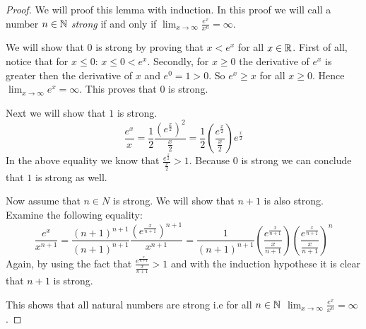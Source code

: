 \begin{proof}
	We will proof this lemma with induction. In this proof we will call a number
	$n \in \mathbb{N}$ \emph{strong} if and only if
	$\lim_{x \rightarrow \infty} \frac{e^{x}}{x^{n}} = \infty$.
	
	We will show that $0$ is strong by proving that $x \lt e^{x}$ for all 
	$x \in \mathbb{R}$. First of all, notice that for $x \le 0$: $x \le 0 \lt e^{x}$.
	Secondly, for $x \ge 0$	the derivative of $e^{x}$ is greater then the 
	derivative of $x$ and $e^{0} = 1 \gt 0$. So $e^{x} \ge x$ for all $x \ge 0$.
	Hence $\lim_{x \rightarrow \infty} e^{x} = \infty$. This proves that $0$
	is strong.
	
	Next we will show that $1$ is strong.
	\[
		\frac{e^{x}}{x} =%
		\frac{1}{2}\frac{\left(e^{\frac{x}{2}}\right)^2}{\frac{x}{2}} =%
		\frac{1}{2}\left(\frac{e^{\frac{x}{2}}}{\frac{x}{2}}\right)e^{\frac{x}{2}}
	\]
	In the above equality we know that 
	$\frac{e^{\frac{x}{2}}}{\frac{x}{2}} > 1$. Because $0$ is strong we can
	conclude that $1$ is strong as well.
	
	Now assume that $n \in N$ is strong. We will show that $n+1$ is also strong.
	Examine the following equality:
	\[
		\frac{e^{x}}{x^{n+1}} =%
		\frac{(n+1)^{n+1}}{(n+1)^{n+1}}%
		\frac{\left(e^{\frac{x}{n+1}}\right)^{n+1}}{x^{n+1}} =%
		\frac{1}{(n+1)^{n+1}}%
		\left(\frac{e^{\frac{x}{n+1}}}{\frac{x}{n+1}}\right)%
		\left(\frac{e^{\frac{x}{n+1}}}{\frac{x}{n+1}}\right)^{n}%
	\]
	Again, by using the fact that $\frac{e^{\frac{x}{n+1}}}{\frac{x}{n+1}} > 1$
	and with the induction hypothese it is clear that $n+1$ is strong.
	
	This shows that all natural numbers are strong i.e for all $n \in \mathbb{N}$
	$\lim_{x \rightarrow \infty} \frac{e^{x}}{x^{n}} = \infty$.
\end{proof}
